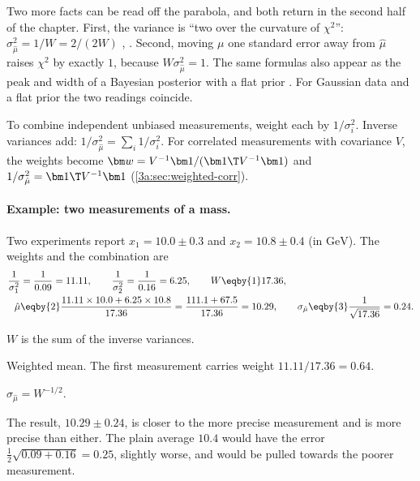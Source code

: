 Two more facts can be read off the parabola, and both return in the second
half of the chapter. First, the variance is ``two over the curvature of
$\chi^2$'': $\sigma_{\hat\mu}^2=1/W=2/(2W)$ ,
. Second, moving $\mu$ one standard error away from
$\hat\mu$ raises $\chi^2$ by exactly $1$, because $W\sigma_{\hat\mu}^2=1$.
The same formulas also appear as the peak and width of a Bayesian posterior
with a flat prior . For Gaussian data and a flat
prior the two readings coincide.

\begin{keyidea}
To combine independent unbiased measurements, weight each by $1/\sigma_i^2$.
Inverse variances add: $1/\sigma_{\hat\mu}^2=\sum_i1/\sigma_i^2$. For
correlated measurements with covariance $V$, the weights become
$\bm w=V^{-1}\bm1/(\bm1\T V^{-1}\bm1)$ and
$1/\sigma_{\hat\mu}^2=\bm1\T V^{-1}\bm1$ (\cref{3a:sec:weighted-corr}).
\end{keyidea}

\paragraph{Example: two measurements of a mass.}
Two experiments report $x_1=10.0\pm0.3$ and $x_2=10.8\pm0.4$ (in
$\mathrm{GeV}$). The weights and the combination are
\begin{align*}
  \frac{1}{\sigma_1^2}&=\frac{1}{0.09}=11.11,\qquad
  \frac{1}{\sigma_2^2}=\frac{1}{0.16}=6.25,\qquad
  W\eqby{1}17.36,\\
  \hat\mu&\eqby{2}\frac{11.11\times10.0+6.25\times10.8}{17.36}
  =\frac{111.1+67.5}{17.36}=10.29,\qquad
  \sigma_{\hat\mu}\eqby{3}\frac{1}{\sqrt{17.36}}=0.24 .
\end{align*}
\begin{explain}
  \item $W$ is the sum of the inverse variances.
  \item Weighted mean. The first measurement carries weight $11.11/17.36=0.64$.
  \item $\sigma_{\hat\mu}=W^{-1/2}$.
\end{explain}
The result, $10.29\pm0.24$, is closer to the more precise measurement and is
more precise than either. The plain average $10.4$ would have the error
$\tfrac12\sqrt{0.09+0.16}=0.25$, slightly worse, and would be pulled
towards the poorer measurement.

